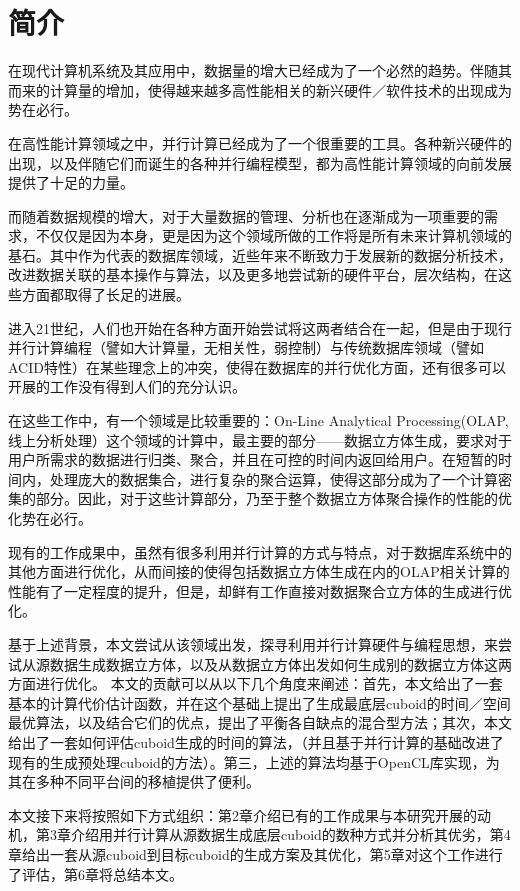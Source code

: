 \chapter{简介}
在现代计算机系统及其应用中，数据量的增大已经成为了一个必然的趋势。伴随其而来的计算量的增加，使得越来越多高性能相关的新兴硬件／软件技术的出现成为势在必行。

在高性能计算领域之中，并行计算已经成为了一个很重要的工具。各种新兴硬件的出现，以及伴随它们而诞生的各种并行编程模型，都为高性能计算领域的向前发展提供了十足的力量。

而随着数据规模的增大，对于大量数据的管理、分析也在逐渐成为一项重要的需求，不仅仅是因为本身，更是因为这个领域所做的工作将是所有未来计算机领域的基石。其中作为代表的数据库领域，近些年来不断致力于发展新的数据分析技术，改进数据关联的基本操作与算法，以及更多地尝试新的硬件平台，层次结构，在这些方面都取得了长足的进展。

进入21世纪，人们也开始在各种方面开始尝试将这两者结合在一起，但是由于现行并行计算编程（譬如大计算量，无相关性，弱控制）与传统数据库领域（譬如ACID特性）在某些理念上的冲突，使得在数据库的并行优化方面，还有很多可以开展的工作没有得到人们的充分认识。

在这些工作中，有一个领域是比较重要的：On-Line Analytical Processing(OLAP, 线上分析处理）这个领域的计算中，最主要的部分——数据立方体生成，要求对于用户所需求的数据进行归类、聚合，并且在可控的时间内返回给用户。在短暂的时间内，处理庞大的数据集合，进行复杂的聚合运算，使得这部分成为了一个计算密集的部分。因此，对于这些计算部分，乃至于整个数据立方体聚合操作的性能的优化势在必行。

现有的工作成果中，虽然有很多利用并行计算的方式与特点，对于数据库系统中的其他方面进行优化，从而间接的使得包括数据立方体生成在内的OLAP相关计算的性能有了一定程度的提升，但是，却鲜有工作直接对数据聚合立方体的生成进行优化。

基于上述背景，本文尝试从该领域出发，探寻利用并行计算硬件与编程思想，来尝试从源数据生成数据立方体，以及从数据立方体出发如何生成别的数据立方体这两方面进行优化。
本文的贡献可以从以下几个角度来阐述：首先，本文给出了一套基本的计算代价估计函数，并在这个基础上提出了生成最底层cuboid的时间／空间最优算法，以及结合它们的优点，提出了平衡各自缺点的混合型方法；其次，本文给出了一套如何评估cuboid生成的时间的算法，（并且基于并行计算的基础改进了现有的生成预处理cuboid的方法）。第三，上述的算法均基于OpenCL库实现，为其在多种不同平台间的移植提供了便利。

本文接下来将按照如下方式组织：第2章介绍已有的工作成果与本研究开展的动机，第3章介绍用并行计算从源数据生成底层cuboid的数种方式并分析其优劣，第4章给出一套从源cuboid到目标cuboid的生成方案及其优化，第5章对这个工作进行了评估，第6章将总结本文。
